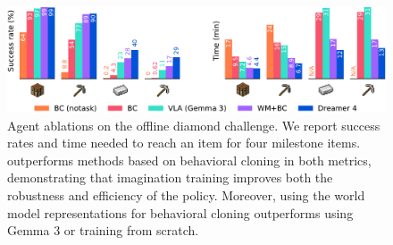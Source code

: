 \begin{figure}[t!]
\centering
\vspace*{-2ex}
\includegraphics[width=\linewidth]{figures/rlabl/rlabl}
\caption{
Agent ablations on the offline diamond challenge.
We report success rates and time needed to reach an item for four milestone items.
\method outperforms methods based on behavioral cloning in both metrics, demonstrating that imagination training improves both the robustness and efficiency of the policy.
Moreover, using the world model representations for behavioral cloning outperforms using Gemma 3 or training from scratch.
}
\label{fig:rlabl}
\end{figure}

